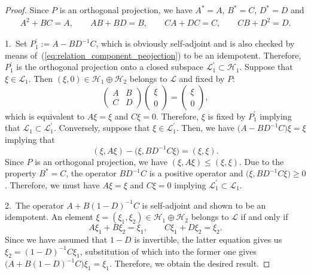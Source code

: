\documentclass[pdftex]{sigma}
\numberwithin{equation}{section}
\newcommand{\pr}[1]{#1^{\prime}}
\newcommand{\mcal}[1]{\mathcal{#1}}
\begin{document}
\begin{proof}
Since $P$ is an orthogonal projection, we have $A^{\ast}=A$, $B^{\ast}=C$, $D^{\ast}=D$ and
\begin{gather}\label{eq:relation_component_peojection}
	A^{2}+BC =A, \qquad AB+BD =B, \qquad CA+DC = C, \qquad CB+D^{2} =D.
\end{gather}

1.~Set $\pr{P}_{1}:=A-BD^{-1}C$, which is obviously self-adjoint and is also checked by means of~(\ref{eq:relation_component_peojection}) to be an idempotent.
		Therefore, $\pr{P}_{1}$ is the orthogonal projection onto a closed subspace $\pr{\mcal{L}}_{1}\subset\mcal{H}_{1}$.
		Suppose that $\xi\in\mcal{L}_{1}$. Then $(\xi,0)\in\mcal{H}_{1}\oplus \mcal{H}_{2}$ belongs to $\mcal{L}$ and fixed by $P$:
		\begin{equation*}
		\left(
		\begin{matrix}
		A & B \\
		C & D
		\end{matrix}
		\right)\left(
		\begin{matrix}
		\xi \\
		0
		\end{matrix}
		\right)=\left(
		\begin{matrix}
		\xi \\
		0
		\end{matrix}
		\right),
		\end{equation*}
		which is equivalent to $A\xi=\xi$ and $C\xi=0$.
		Therefore, $\xi$ is fixed by $\pr{P}_{1}$ implying that $\mcal{L}_{1}\subset \pr{\mcal{L}}_{1}$.
		Conversely, suppose that $\xi\in \pr{\mcal{L}}_{1}$. Then, we have $\big(A-BD^{-1}C\big)\xi=\xi$ implying that
		\begin{equation*}
			(\xi,A\xi)-\big(\xi,BD^{-1}C\xi\big)=(\xi,\xi).
		\end{equation*}
		Since $P$ is an orthogonal projection, we have $(\xi,A\xi)\le (\xi,\xi)$. Due to the property $B^{\ast}=C$, the operator $BD^{-1}C$ is a positive operator and $\big(\xi,BD^{-1}C\xi\big)\ge 0$. Therefore, we must have $A\xi=\xi$ and $C\xi=0$ implying $\pr{\mcal{L}}_{1}\subset \mcal{L}_{1}$.

2.~The operator $A+B(1-D)^{-1}C$ is self-adjoint and shown to be an idempotent.
		An element $\xi=(\xi_{1},\xi_{2})\in\mcal{H}_{1}\oplus\mcal{H}_{2}$ belongs to $\mcal{L}$ if and only if
		\begin{equation*}
			A\xi_{1}+B\xi_{2}=\xi_{1},\qquad C\xi_{1}+D\xi_{2}=\xi_{2}.
		\end{equation*}
		Since we have assumed that $1-D$ is invertible, the latter equation gives us $\xi_{2}=(1-D)^{-1}C\xi_{1}$, substitution of which into the former one gives $\big(A+B(1-D)^{-1}C\big)\xi_{1}=\xi_{1}$. Therefore, we obtain the desired result.
\end{proof}
\end{document}

